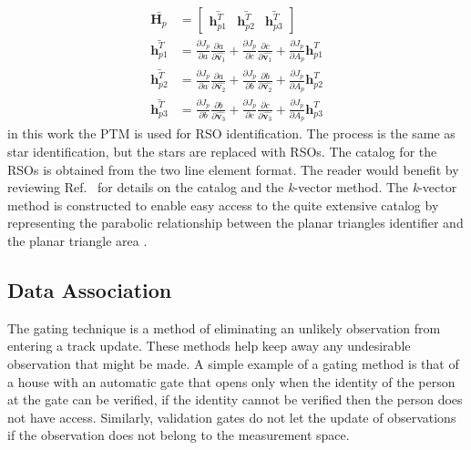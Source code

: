 \documentclass[]{aiaa-tc}%
\begin{document}
\begin{subequations}
\begin{align}
\bar{\textbf{H}_p} &= 
\begin{bmatrix}
\bar{\textbf{h}^T_{p1}} & \bar{\textbf{h}^T_{p2}}& \bar{\textbf{h}^T_{p3}}
\end{bmatrix}\\
\bar{\textbf{h}^T_{p1}} &= \frac{\partial J_p}{\partial a} \frac{\partial a}{\partial{\hat{\textbf{v}_1}}} + \frac{\partial J_p}{\partial c} \frac{\partial c}{\partial {\hat{\textbf{v}_1}}} + \frac{\partial J_p}{\partial A_p}  \textbf{h}^T_{p1}\\
\bar{\textbf{h}^T_{p2}} &= \frac{\partial J_p}{\partial a} \frac{\partial a}{\partial{\hat{\textbf{v}_2}}} + \frac{\partial J_p}{\partial b} \frac{\partial b}{\partial {\hat{\textbf{v}_2}}} + \frac{\partial J_p}{\partial A_p}  \textbf{h}^T_{p2}\\
\bar{\textbf{h}^T_{p3}} &= \frac{\partial J_p}{\partial b} \frac{\partial b}{\partial{\hat{\textbf{v}_3}}} + \frac{\partial J_p}{\partial c} \frac{\partial c}{\partial {\hat{\textbf{v}_3}}} + \frac{\partial J_p}{\partial A_p}  \textbf{h}^T_{p3}
\end{align}
\end{subequations}
in this work the PTM is used for RSO identification. The process is the same as star identification, but the stars are replaced with RSOs. The catalog for the RSOs is obtained from the two line element format. The reader would benefit by reviewing Ref.~ for details on the catalog  and the \textit{k}-vector method. The \textit{k}-vector method is constructed to enable easy access to the quite extensive catalog by representing the parabolic relationship between the planar triangles identifier and the planar triangle area \cite{cole_fast_2006,PTM}.\\

\subsection{Data Association}
The gating technique is a method of eliminating an unlikely observation from entering a track update. These methods help keep away any  undesirable observation that might be made. A simple example of a gating method is that of a house with an automatic gate that opens only when the identity of the person at the gate can be verified, if the identity cannot be verified then the person does not have access. Similarly, validation gates do not let the update of observations if the observation does not belong to the measurement space.\\
\end{document}
